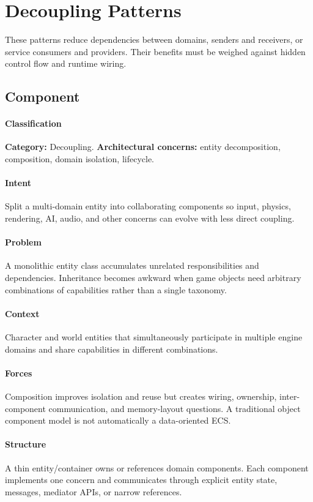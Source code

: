 \documentclass[11pt]{article}
\begin{document}
\section{Decoupling Patterns}\label{sec:decoupling}
These patterns reduce dependencies between domains, senders and receivers, or service consumers and providers. Their benefits must be weighed against hidden control flow and runtime wiring.

\subsection{Component}\label{pat:component}
\paragraph{Classification} \textbf{Category:} Decoupling. \textbf{Architectural concerns:} entity decomposition, composition, domain isolation, lifecycle.
\paragraph{Intent} Split a multi-domain entity into collaborating components so input, physics, rendering, AI, audio, and other concerns can evolve with less direct coupling.
\paragraph{Problem} A monolithic entity class accumulates unrelated responsibilities and dependencies. Inheritance becomes awkward when game objects need arbitrary combinations of capabilities rather than a single taxonomy.
\paragraph{Context} Character and world entities that simultaneously participate in multiple engine domains and share capabilities in different combinations.
\paragraph{Forces} Composition improves isolation and reuse but creates wiring, ownership, inter-component communication, and memory-layout questions. A traditional object component model is not automatically a data-oriented ECS.
\paragraph{Structure} A thin entity/container owns or references domain components. Each component implements one concern and communicates through explicit entity state, messages, mediator APIs, or narrow references.
\end{document}

